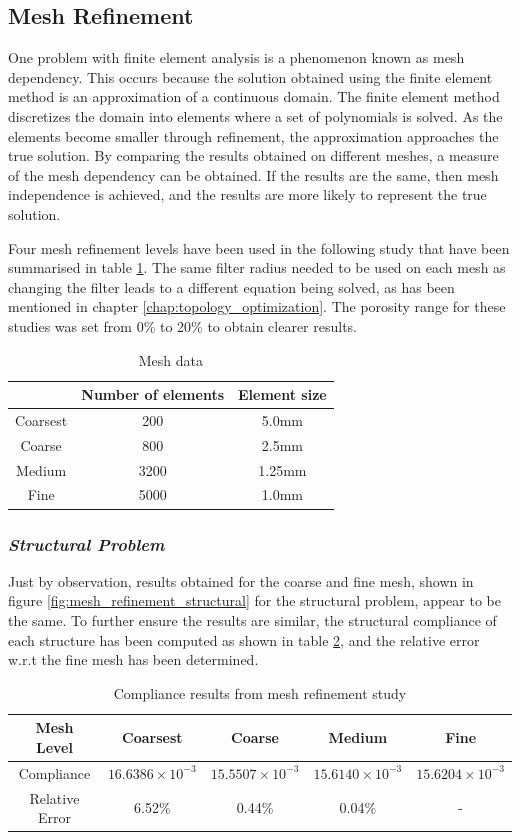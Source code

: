 \subsection*{Mesh Refinement}
One problem with finite element analysis is a phenomenon known as mesh dependency. This occurs because the solution obtained using the finite element method is an approximation of a continuous domain. The finite element method discretizes the domain into elements where a set of polynomials is solved. As the elements become smaller through refinement, the approximation approaches the true solution. By comparing the results obtained on different meshes, a measure of the mesh dependency can be obtained. If the results are the same, then mesh independence is achieved, and the results are more likely to represent the true solution. 

Four mesh refinement levels have been used in the following study that have been summarised in table \ref{table:mesh_refinement_mesh_data}. The same filter radius needed to be used on each mesh as changing the filter leads to a different equation being solved, as has been mentioned in chapter \ref{chap:topology_optimization}. The porosity range for these studies was set from 0\% to 20\% to obtain clearer results.
\begin{table}[ht]
  \centering
  \begin{tabular}{c | c | c}
    & Number of elements & Element size \\ \hline
    Coarsest & 200 & 5.0mm \\ \hline
    Coarse & 800 & 2.5mm \\ \hline
    Medium & 3200 & 1.25mm \\ \hline
    Fine & 5000 & 1.0mm \\ \hline
  \end{tabular}
  \caption{Mesh data}
  \label{table:mesh_refinement_mesh_data}
\end{table}

\subsubsection*{\emph{Structural Problem}}
Just by observation, results obtained for the coarse and fine mesh, shown in figure \ref{fig:mesh_refinement_structural} for the structural problem, appear to be the same. To further ensure the results are similar, the structural compliance of each structure has been computed as shown in table \ref{table:mesh_refinement_compliance}, and the relative error w.r.t the fine mesh has been determined. 
\begin{table}[ht]
  \centering
  \begin{tabular}{c | c | c | c | c}
    Mesh Level & Coarsest & Coarse & Medium & Fine \\ \hline
    Compliance & $16.6386\times10^{-3}$ & $15.5507\times10^{-3}$ & $15.6140\times10^{-3}$ & $15.6204\times10^{-3}$ \\ \hline
    Relative Error & 6.52\% & 0.44\% & 0.04\% & - \\ \hline
  \end{tabular}
  \caption{Compliance results from mesh refinement study}
  \label{table:mesh_refinement_compliance}
\end{table}

